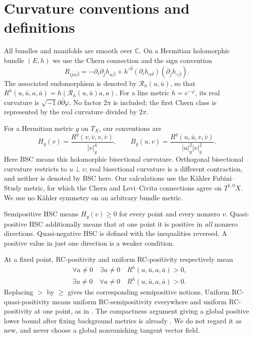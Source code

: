 \documentclass[12pt]{amsart}
\theoremstyle{definition}
\theoremstyle{remark}
\numberwithin{equation}{section}
\newcommand{\C}{\mathbb{C}}
\begin{document}
\section{Curvature conventions and definitions}

All bundles and manifolds are smooth over $\C$. On a Hermitian holomorphic bundle $(E,h)$ we use the Chern connection and the sign convention
\begin{equation}\label{en:chern}
R_{i\bar j\alpha\bar\beta}
=-\partial_i\partial_{\bar j}h_{\alpha\bar\beta}
+h^{\gamma\bar\delta}
 (\partial_i h_{\alpha\bar\delta})(\partial_{\bar j}h_{\gamma\bar\beta}).
\end{equation}
The associated endomorphism is denoted by $\mathcal R_h(u,\bar u)$, so that $R^h(u,\bar u,a,\bar a)=h(\mathcal R_h(u,\bar u)a,a)$. For a line metric $h=e^{-\varphi}$, its real curvature is $\sqrt{-1}\partial\bar\partial\varphi$. No factor $2\pi$ is included; the first Chern class is represented by the real curvature divided by $2\pi$.

For a Hermitian metric $g$ on $T_X$, our conventions are
\[
H_g(v)=\frac{R^g(v,\bar v,v,\bar v)}{|v|_g^4},\qquad
B_g(u,v)=\frac{R^g(u,\bar u,v,\bar v)}{|u|_g^2|v|_g^2}.
\]
Here BSC means this holomorphic bisectional curvature. Orthogonal bisectional curvature restricts to $u\perp v$; real bisectional curvature is a different contraction, and neither is denoted by BSC here. Our calculations use the Kähler Fubini--Study metric, for which the Chern and Levi--Civita connections agree on $T^{1,0}X$. We use no Kähler symmetry on an arbitrary bundle metric.

Semipositive HSC means $H_g(v)\ge0$ for every point and every nonzero $v$. Quasi-positive HSC additionally means that at one point it is positive in \emph{all} nonzero directions. Quasi-negative HSC is defined with the inequalities reversed. A positive value in just one direction is a weaker condition.

At a fixed point, RC-positivity and uniform RC-positivity respectively mean
\begin{align*}
&\forall a\ne0\quad\exists u\ne0\quad R^h(u,\bar u,a,\bar a)>0,\\
&\exists u\ne0\quad\forall a\ne0\quad R^h(u,\bar u,a,\bar a)>0.
\end{align*}
Replacing $>$ by $\ge$ gives the corresponding semipositive notions. Uniform RC-quasi-positivity means uniform RC-semipositivity everywhere and uniform RC-positivity at one point, as in \cite[Definition~1.1]{en:Y20}. The compactness argument giving a global positive lower bound after fixing background metrics is already \cite[Proposition~2.9]{en:Y20}. We do not regard it as new, and never choose a global nonvanishing tangent vector field.
\end{document}
